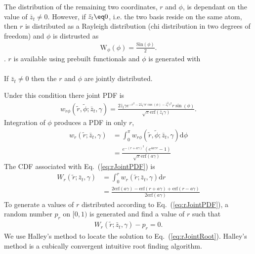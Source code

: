 \documentclass{revtex4}
\begin{document}
  The distribution of the remaining two coordinates, $r$ and $\phi$, is dependant on the value of $\bar{z}_t\neq0$.
  However, if $\bar{z}_t\eq0$, i.e. the two basis reside on the same atom, then $r$ is distributed as a Rayleigh distribution (chi distribution in two degrees of freedom) and
  $\phi$ is distrusted as
  \begin{align}
    \mathrm{W}_{\phi}\left(\phi\right) = \frac{\mathrm{Sin}(\phi)}{2}.
  \end{align}.
  $r$ is available using prebuilt functionals and $\phi$ is generated with
  \begin{align}
  \end{align}

  If $\bar{z}_t\neq0$ then the $r$ and $\phi$ are jointly distributed. 
  
  Under this condition there joint PDF is
  \begin{align}
    w_{r\phi}\left(\tilde{r}, \tilde{\phi}; \bar{z}_t, \gamma \right) = 
    \frac{2 \bar{z}_t \gamma e^{-r^2-2 \bar{z}_t \gamma  r \cos (\phi )-\bar{z}_t^2 \gamma ^2} r \sin (\phi ) }{\sqrt{\pi } \text{erf}(\bar{z}_t \gamma )}.
    \label{eq:JointPDF}
  \end{align}
  Integration of $\phi$ produces a PDF in only $r$,
  \begin{align}
    w_{r}\left(\tilde{r}; \bar{z}_t, \gamma \right) &= \int_0^\pi w_{r\phi}\left(\tilde{r}, \tilde{\phi}; \bar{z}_t, \gamma \right) \mathrm{d}\phi \\
    &=\frac{e^{-(r+a \gamma)^2} \left(e^{4 a \gamma  r}-1\right)}{\sqrt{\pi } \text{erf}(a \gamma )}
    \label{eq:rJointPDF}
  \end{align}
  The CDF associated with Eq.\ (\ref{eq:rJointPDF}) is
  \begin{align}
    W_{r}\left(\tilde{r}; \bar{z}_t, \gamma \right) &= \int_0^r w_{r}\left(\tilde{r}; \bar{z}_t, \gamma \right) \mathrm{d}r \\
    &= \frac{2 \text{erf}(a \gamma )-\text{erf}(r + a \gamma)+\text{erf}(r-a \gamma )}{2 \text{erf}(a \gamma )}
  \end{align}
  To generate a values of $r$ distributed according to Eq.\ (\ref{eq:rJointPDF}), a random number $p_r$ on $[0, 1)$ is generated and find a value of $r$ such that
  \begin{align}
    W_{r}\left(\tilde{r}; \bar{z}_t, \gamma \right) - p_r = 0.
    \label{eq:rJointRoot}
  \end{align}
  We use Halley's method to locate the solution to Eq.\ (\ref{eq:rJointRoot}). Halley's method is a cubically convergent intuitive root finding algorithm.\cite{} 
\end{document}
